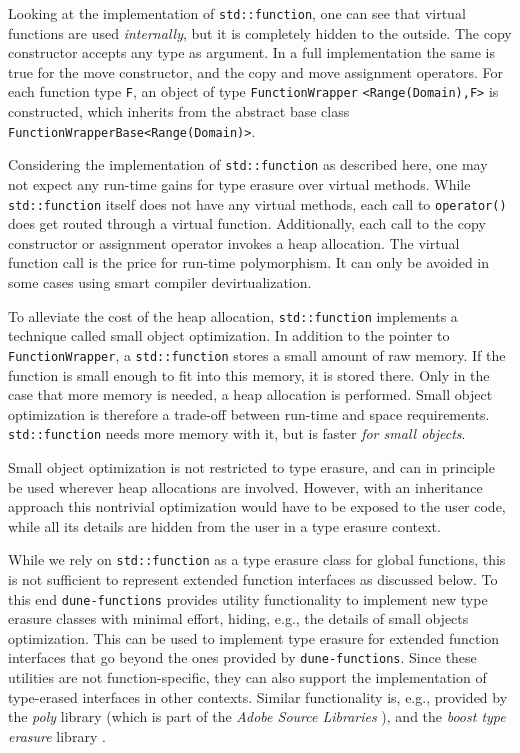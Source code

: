 \documentclass[11pt,
                 numbers=noenddot,
                 headings=normal,
                 DIV16, BCOR10mm]{scrartcl}
\newcommand{\cpp}{\lstinline}
\theoremstyle{remark}
\newcommand{\dunemodule}[1]{\texttt{#1}}
\begin{document}
Looking at the implementation of \cpp{std::function}, one can see that virtual functions are used {\em internally},
but it is completely hidden to the outside. The copy constructor accepts any type as argument.
In a full implementation the same is true for the move constructor,
and the copy and move assignment operators.
For each function type \cpp{F}, an object of type \cpp{FunctionWrapper} \linebreak \cpp{<Range(Domain),F>} is constructed, which inherits
from the abstract base class \linebreak \cpp{FunctionWrapperBase<Range(Domain)>}.

Considering the implementation of \cpp{std::function} as described here, one may not expect any run-time gains for
type erasure over virtual methods.  While \cpp{std::function} itself does not have any virtual methods, each call
to \cpp{operator()} does get routed through a virtual function.  Additionally, each call to the copy constructor
or assignment operator invokes a heap allocation.  The virtual function call is the price for run-time polymorphism.
It can only be avoided in some cases using smart compiler devirtualization.

To alleviate the cost of the heap allocation, \cpp{std::function} implements a technique called small object optimization.
In addition to the pointer to \cpp{FunctionWrapper}, a \cpp{std::function} stores a small amount of raw memory.
If the function is small enough to fit into this memory, it is stored there.
Only in the case that more memory is needed, a heap allocation is performed.  Small object optimization is therefore
a trade-off between run-time and space requirements.  \cpp{std::function} needs more memory with it, but is faster
{\em for small objects}.

Small object optimization is not restricted to type erasure, and can in principle be used wherever heap allocations
are involved.  However, with an inheritance approach this nontrivial optimization would have to
be exposed to the user code, while all its details are hidden from the user in a type erasure context.

While we rely on \cpp{std::function} as a type erasure class for global functions,
this is not sufficient to represent extended function interfaces as discussed below.
To this end \dunemodule{dune-functions} provides utility functionality to implement
new type erasure classes with minimal effort, hiding, e.g., the details of
small objects optimization. This can be used to implement type erasure
for extended function interfaces that go beyond the ones provided by
\dunemodule{dune-functions}.
Since these utilities are not function-specific, they can
also support the implementation of type-erased
interfaces in other contexts. Similar functionality is, e.g., provided
by the \emph{poly} library (which is part of the \emph{Adobe Source Libraries} \cite{Adobe:asl}),
and the \emph{boost type erasure} library \cite{Watanabe:boost_type_erasure}.
\end{document}
